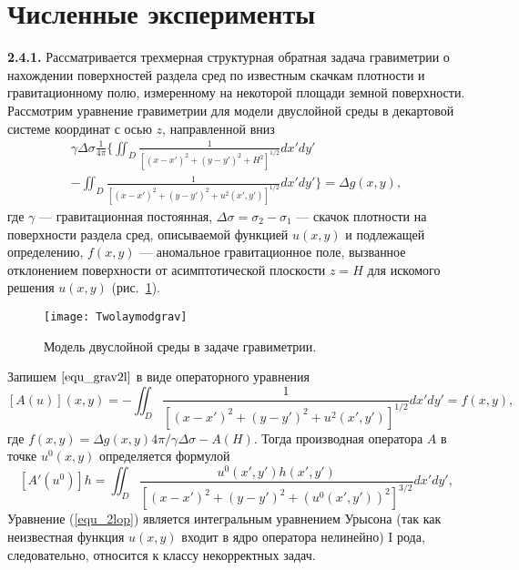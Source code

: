 \newpage
\section{Численные эксперименты}

{\bfseries 2.4.1.} Рассматривается трехмерная структурная обратная задача гравиметрии о нахождении поверхностей раздела сред по известным скачкам плотности и гравитационному полю, измеренному на некоторой площади земной поверхности.
Рассмотрим уравнение гравиметрии для модели двуслойной среды в декартовой системе координат с осью $z$, направленной вниз 
\begin{equation}\label{equ_grav2l}
\begin{aligned}
\gamma\Delta\sigma\frac{1}{4\pi} \bigg\{ \iint_{D} \frac{1}{[(x-x')^2+(y-y')^2+H^2]^{1/2}}dx'dy' \\
- 
\iint_{D} \frac{1}{[(x-x')^2+(y-y')^2+u^2(x',y')]^{1/2}}dx'dy'\bigg\}=\Delta g(x,y),
\end{aligned} 
\end{equation}
где $\gamma$ --- гравитационная постоянная, $\Delta\sigma=\sigma_2-\sigma_1$ --- скачок плотности на поверхности раздела сред, описываемой функцией $u(x,y)$ и подлежащей определению, $f(x,y)$ --- аномальное гравитационное поле, вызванное отклонением поверхности от асимптотической плоскости $z=H$ для искомого решения $u(x,y)$ (рис.~\ref{fig:twolayergrav}). 
\begin{figure}
	\centering
	\texttt{[image: Twolaymodgrav]}
	\caption{Модель двуслойной среды в задаче гравиметрии.}
	\label{fig:twolayergrav}
	\end{figure}
Запишем $\eqref{equ_grav2l}$ в виде операторного уравнения
\begin{equation}\label{equ_2lop}
	[A(u)](x,y)=-\iint_{D} \frac{1}{[(x-x')^2+(y-y')^2+u^2(x',y')]^{1/2}}dx'dy'=f(x,y),
\end{equation}
где $f(x,y)=\Delta g(x,y) 4\pi/\gamma\Delta\sigma - A(H)$. Тогда производная оператора $A$ в точке $u^0(x,y)$ определяется формулой
$$ [A'(u^0)]h=\iint_{D} \frac{u^0(x',y')h(x',y')}{[(x-x')^2+(y-y')^2+(u^0(x',y'))^2]^{3/2}}dx'dy', $$
Уравнение (\ref{equ_2lop}) является интегральным уравнением Урысона (так как неизвестная функция $u(x,y)$ входит в ядро оператора нелинейно) I рода, следовательно, относится к классу некорректных задач.
	
